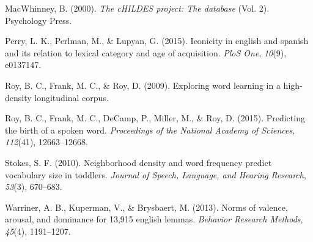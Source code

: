 \documentclass[10pt, letterpaper]{article}
\begin{document}
MacWhinney, B. (2000). \emph{The cHILDES project: The database} (Vol.
2). Psychology Press.

Perry, L. K., Perlman, M., \& Lupyan, G. (2015). Iconicity in english
and spanish and its relation to lexical category and age of acquisition.
\emph{PloS One}, \emph{10}(9), e0137147.

Roy, B. C., Frank, M. C., \& Roy, D. (2009). Exploring word learning in
a high-density longitudinal corpus.

Roy, B. C., Frank, M. C., DeCamp, P., Miller, M., \& Roy, D. (2015).
Predicting the birth of a spoken word. \emph{Proceedings of the National
Academy of Sciences}, \emph{112}(41), 12663--12668.

Stokes, S. F. (2010). Neighborhood density and word frequency predict
vocabulary size in toddlers. \emph{Journal of Speech, Language, and
Hearing Research}, \emph{53}(3), 670--683.

Warriner, A. B., Kuperman, V., \& Brysbaert, M. (2013). Norms of
valence, arousal, and dominance for 13,915 english lemmas.
\emph{Behavior Research Methods}, \emph{45}(4), 1191--1207.
\end{document}
